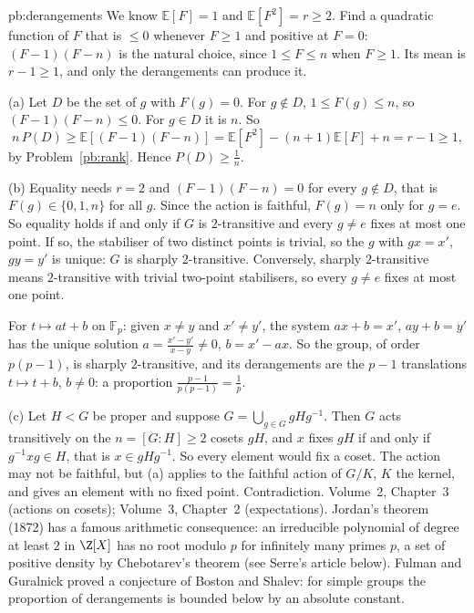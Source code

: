 \begin{solution}{pb:derangements}
\idea We know $\mathbb E[F]=1$ and $\mathbb E[F^2]=r\ge2$. Find a quadratic function of $F$ that is $\le0$ whenever $F\ge1$ and
positive at $F=0$: $(F-1)(F-n)$ is the natural choice, since $1\le F\le n$ when $F\ge1$. Its mean is $r-1\ge1$, and only the
derangements can produce it.

\writeup (a) Let $D$ be the set of $g$ with $F(g)=0$. For $g\notin D$, $1\le F(g)\le n$, so $(F-1)(F-n)\le0$. For $g\in D$ it is $n$.
So
\[
n\,P(D)\ge\mathbb E[(F-1)(F-n)]=\mathbb E[F^2]-(n+1)\mathbb E[F]+n=r-1\ge1,
\]
by Problem~\ref{pb:rank}. Hence $P(D)\ge\frac1n$.

(b) Equality needs $r=2$ and $(F-1)(F-n)=0$ for every $g\notin D$, that is $F(g)\in\{0,1,n\}$ for all $g$. Since the action is
faithful, $F(g)=n$ only for $g=e$. So equality holds if and only if $G$ is $2$-transitive and every $g\ne e$ fixes at most one
point. If so, the stabiliser of two distinct points is trivial, so the $g$ with $gx=x'$, $gy=y'$ is unique: $G$ is sharply
$2$-transitive. Conversely, sharply $2$-transitive means $2$-transitive with trivial two-point stabilisers, so every $g\ne e$
fixes at most one point.

For $t\mapsto at+b$ on $\mathbb F_p$: given $x\ne y$ and $x'\ne y'$, the system $ax+b=x'$, $ay+b=y'$ has the unique solution
$a=\frac{x'-y'}{x-y}\ne0$, $b=x'-ax$. So the group, of order $p(p-1)$, is sharply $2$-transitive, and its derangements are the
$p-1$ translations $t\mapsto t+b$, $b\ne0$: a proportion $\frac{p-1}{p(p-1)}=\frac1p$.

(c) Let $H<G$ be proper and suppose $G=\bigcup_{g\in G}gHg^{-1}$. Then $G$ acts transitively on the
$n=[G:H]\ge2$ cosets $gH$, and $x$ fixes $gH$ if and only if $g^{-1}xg\in H$, that is $x\in gHg^{-1}$. So every element would fix a
coset. The action may not be faithful, but (a) applies to the faithful action of $G/K$, $K$ the kernel, and gives an element
with no fixed point. Contradiction.
\tools Volume~2, Chapter~3 (actions on cosets); Volume~3, Chapter~2 (expectations).
\leads Jordan's theorem (1872) has a famous arithmetic consequence: an irreducible polynomial of degree at least $2$ in
$\Z[X]$ has no root modulo $p$ for infinitely many primes $p$, a set of positive density by Chebotarev's theorem (see Serre's
article below). Fulman and Guralnick proved a conjecture of Boston and Shalev: for simple groups the proportion of
derangements is bounded below by an absolute constant.
\end{solution}

